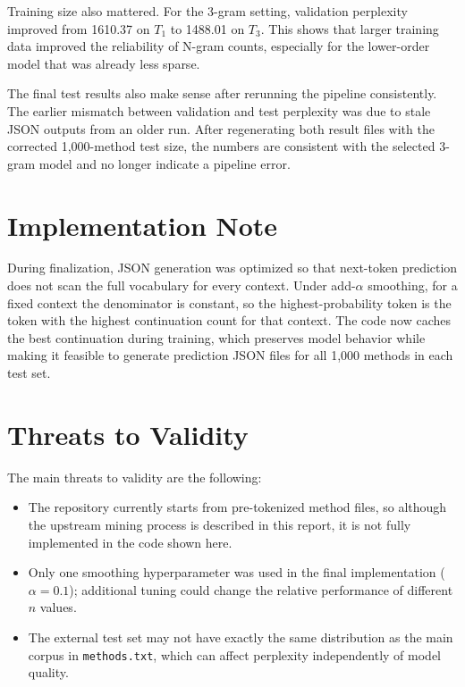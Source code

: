 \documentclass[11pt]{article}
\begin{document}
Training size also mattered. For the 3-gram setting, validation perplexity improved from 1610.37 on \(T_1\) to 1488.01 on \(T_3\). This shows that larger training data improved the reliability of N-gram counts, especially for the lower-order model that was already less sparse.

The final test results also make sense after rerunning the pipeline consistently. The earlier mismatch between validation and test perplexity was due to stale JSON outputs from an older run. After regenerating both result files with the corrected 1,000-method test size, the numbers are consistent with the selected 3-gram model and no longer indicate a pipeline error.

\section{Implementation Note}
During finalization, JSON generation was optimized so that next-token prediction does not scan the full vocabulary for every context. Under add-\(\alpha\) smoothing, for a fixed context the denominator is constant, so the highest-probability token is the token with the highest continuation count for that context. The code now caches the best continuation during training, which preserves model behavior while making it feasible to generate prediction JSON files for all 1,000 methods in each test set.

\section{Threats to Validity}
The main threats to validity are the following:
\begin{itemize}[leftmargin=*]
  \item The repository currently starts from pre-tokenized method files, so although the upstream mining process is described in this report, it is not fully implemented in the code shown here.
  \item Only one smoothing hyperparameter was used in the final implementation (\(\alpha = 0.1\)); additional tuning could change the relative performance of different \(n\) values.
  \item The external test set may not have exactly the same distribution as the main corpus in \texttt{methods.txt}, which can affect perplexity independently of model quality.
\end{itemize}
\end{document}
